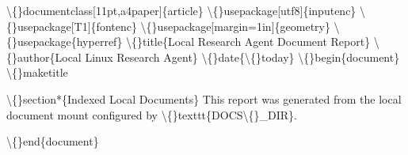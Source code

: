 \textbackslash\{\}documentclass[11pt,a4paper]\{article\}
\textbackslash\{\}usepackage[utf8]\{inputenc\}
\textbackslash\{\}usepackage[T1]\{fontenc\}
\textbackslash\{\}usepackage[margin=1in]\{geometry\}
\textbackslash\{\}usepackage\{hyperref\}
\textbackslash\{\}title\{Local Research Agent Document Report\}
\textbackslash\{\}author\{Local Linux Research Agent\}
\textbackslash\{\}date\{\textbackslash\{\}today\}
\textbackslash\{\}begin\{document\}
\textbackslash\{\}maketitle


\textbackslash\{\}section*\{Indexed Local Documents\}
This report was generated from the local document mount configured by \textbackslash\{\}texttt\{DOCS\textbackslash\{\}\_DIR\}.



\textbackslash\{\}end\{document\}
